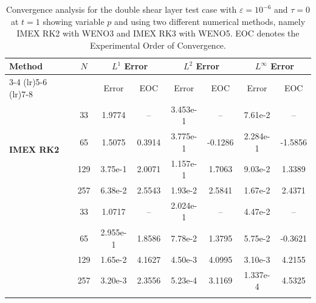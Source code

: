 \documentclass[final,11pt]{siamart251216}
\numberwithin{equation}{section}
\theoremstyle{definition}
\theoremstyle{remark}
\begin{document}
\begin{table}[htbp]
    \centering
    \small
    \begin{tabular}{@{} l c cc cc cc @{}}
        \toprule
        \multirow{2}{*}{\textbf{Method}} & \multirow{2}{*}{$N$} & \multicolumn{2}{c}{\textbf{$L^1$ Error}} & \multicolumn{2}{c}{\textbf{$L^2$ Error}} & \multicolumn{2}{c}{\textbf{$L^\infty$ Error}} \\
        \cmidrule(lr){3-4} \cmidrule(lr){5-6} \cmidrule(lr){7-8}
        & & Error & EOC & Error & EOC & Error & EOC \\
        \midrule
        \multirow{4}{*}{\textbf{IMEX RK2}} 
        & 33  & 1.9774 & --   & 3.453e-1 & --   & 7.61e-2 & --   \\
       & 65  & 1.5075 & 0.3914 & 3.775e-1 & -0.1286 & 2.284e-1 & -1.5856 \\
       & 129  & 3.75e-1 & 2.0071 & 1.157e-1 & 1.7063 & 9.03e-2 & 1.3389 \\
        & 257  & 6.38e-2 & 2.5543 & 1.93e-2 & 2.5841 & 1.67e-2 & 2.4371 \\
        
        \addlinespace[0.3cm]
        \multirow{4}{*}{\textbf{IMEX RK3}} 
        & 33  & 1.0717 & --   & 2.024e-1 & --   & 4.47e-2 & --   \\
        & 65  & 2.955e-1 & 1.8586 & 7.78e-2 & 1.3795 & 5.75e-2 & -0.3621 \\
        & 129  & 1.65e-2 & 4.1627 & 4.50e-3 & 4.0995 & 3.10e-3 & 4.2155 \\
        & 257  & 3.20e-3 & 2.3556 & 5.23e-4 & 3.1169 & 1.337e-4 & 4.5325 \\
 \\
        
        
        \bottomrule
    \end{tabular}
    \caption{Convergence analysis for the double shear layer test case with $\varepsilon = 10^{-6}$ and $\tau = 0$ at $t = 1$ showing variable $p$ and using two different numerical methods, namely IMEX RK2 with WENO3 and IMEX RK3 with WENO5. EOC denotes the Experimental Order of Convergence.}
        \label{tab:convergence_p}
\end{table}
\end{document}
